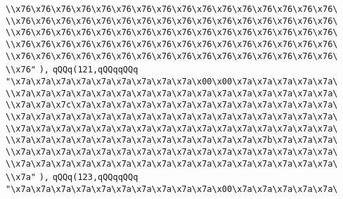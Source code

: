 \verb|\\x76\x76\x76\x76\x76\x76\x76\x76\x76\x76\x76\x76\x76\x76\x76\x76\|\newline
\verb|\\x76\x76\x76\x76\x76\x76\x76\x76\x76\x76\x76\x76\x76\x76\x76\x76\|\newline
\verb|\\x76\x76\x76\x76\x76\x76\x76\x76\x76\x76\x76\x76\x76\x76\x76\x76\|\newline
\verb|\\x76\x76\x76\x76\x76\x76\x76\x76\x76\x76\x76\x76\x76\x76\x76\x76\|\newline
\verb|\\x76\x76\x76\x76\x76\x76\x76\x76\x76\x76\x76\x76\x76\x76\x76\x76\|\newline
\verb|\\x76"|\newline
\verb|),|\newline
\verb|qQQq(121,qQQqqQQq|\newline
\verb|"\x7a\x7a\x7a\x7a\x7a\x7a\x7a\x7a\x7a\x00\x00\x7a\x7a\x7a\x7a\x7a\|\newline
\verb|\\x7a\x7a\x7a\x7a\x7a\x7a\x7a\x7a\x7a\x7a\x7a\x7a\x7a\x7a\x7a\x7a\|\newline
\verb|\\x7a\x7a\x7c\x7a\x7a\x7a\x7a\x7a\x7a\x7a\x7a\x7a\x7a\x7a\x7a\x7a\|\newline
\verb|\\x7a\x7a\x7a\x7a\x7a\x7a\x7a\x7a\x7a\x7a\x7a\x7a\x7a\x7a\x7a\x7a\|\newline
\verb|\\x7a\x7a\x7a\x7a\x7a\x7a\x7a\x7a\x7a\x7a\x7a\x7a\x7a\x7a\x7a\x7a\|\newline
\verb|\\x7a\x7a\x7a\x7a\x7a\x7a\x7a\x7a\x7a\x7a\x7a\x7a\x7b\x7a\x7a\x7a\|\newline
\verb|\\x7a\x7a\x7a\x7a\x7a\x7a\x7a\x7a\x7a\x7a\x7a\x7a\x7a\x7a\x7a\x7a\|\newline
\verb|\\x7a\x7a\x7a\x7a\x7a\x7a\x7a\x7a\x7a\x7a\x7a\x7a\x7a\x7a\x7a\x7a\|\newline
\verb|\\x7a"|\newline
\verb|),|\newline
\verb|qQQq(123,qQQqqQQq|\newline
\verb|"\x7a\x7a\x7a\x7a\x7a\x7a\x7a\x7a\x7a\x7a\x00\x7a\x7a\x7a\x7a\x7a\|\newline
